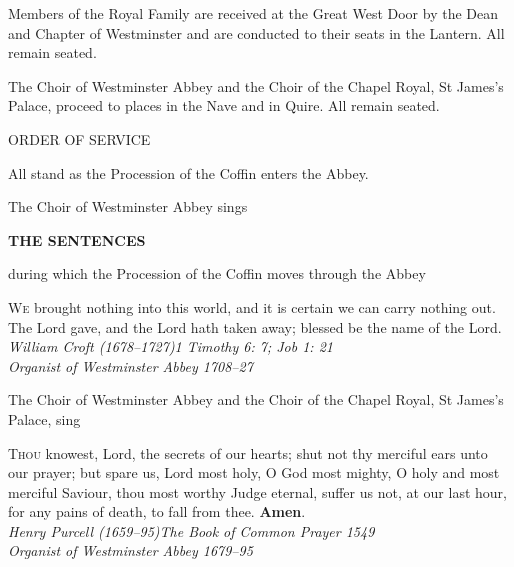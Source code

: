 


Members of the Royal Family are received at the Great West Door by the Dean and Chapter of
Westminster and are conducted to their seats in the Lantern. All remain seated.


The Choir of Westminster Abbey and the Choir of the Chapel Royal, St James’s Palace, proceed to
places in the Nave and in Quire. All remain seated.\begin{center}
\normalfont\color{black}\LARGE{} ORDER OF SERVICE
\end{center}

All stand as the Procession of the Coffin enters the Abbey.



The Choir of Westminster Abbey sings
\begin{center}\normalfont\bfseries
THE SENTENCES
\end{center}
during which the Procession of the Coffin moves through the Abbey



\color{black}\normalfont \lettrine[lines=2,loversize=.2]{W}{e} brought nothing into this world, and it is certain we can carry nothing out.\\The Lord gave, and the Lord hath taken away; blessed be the name of the Lord.\color{qred}\itshape\\
William Croft (1678–1727)\hfill 1 Timothy 6: 7; Job 1: 21\\
Organist of Westminster Abbey 1708–27



The Choir of Westminster Abbey and the Choir of the Chapel Royal, St James’s Palace, sing

\color{black}\normalfont \lettrine[lines=2,loversize=.2]{T}{hou} knowest, Lord, the secrets of our hearts; shut not thy merciful ears unto our
prayer; but spare us, Lord most holy, O God most mighty, O holy and most
merciful Saviour, thou most worthy Judge eternal, suffer us not, at our last hour, for
any pains of death, to fall from thee. \textbf{Amen}.\\\itshape\color{qred}
Henry Purcell (1659–95)\hfill The Book of Common Prayer 1549\\
Organist of Westminster Abbey 1679–95



